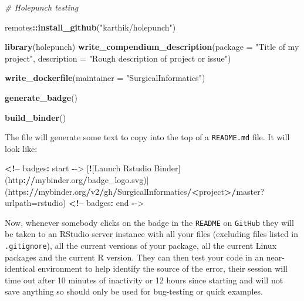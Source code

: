 \documentclass[]{book}
\newenvironment{Shaded}{\begin{snugshade}}{\end{snugshade}}
\newcommand{\CommentTok}[1]{\textcolor[rgb]{0.56,0.35,0.01}{\textit{#1}}}
\newcommand{\DataTypeTok}[1]{\textcolor[rgb]{0.13,0.29,0.53}{#1}}
\newcommand{\ErrorTok}[1]{\textcolor[rgb]{0.64,0.00,0.00}{\textbf{#1}}}
\newcommand{\KeywordTok}[1]{\textcolor[rgb]{0.13,0.29,0.53}{\textbf{#1}}}
\newcommand{\NormalTok}[1]{#1}
\newcommand{\OperatorTok}[1]{\textcolor[rgb]{0.81,0.36,0.00}{\textbf{#1}}}
\newcommand{\StringTok}[1]{\textcolor[rgb]{0.31,0.60,0.02}{#1}}
\begin{document}
\begin{Shaded}
\begin{Highlighting}[]
\CommentTok{# Holepunch testing}

\NormalTok{remotes}\OperatorTok{::}\KeywordTok{install_github}\NormalTok{(}\StringTok{"karthik/holepunch"}\NormalTok{)}

\KeywordTok{library}\NormalTok{(holepunch)}
\KeywordTok{write_compendium_description}\NormalTok{(}\DataTypeTok{package =} \StringTok{"Title of my project"}\NormalTok{, }
                             \DataTypeTok{description =} \StringTok{"Rough description of project or issue"}\NormalTok{)}

\KeywordTok{write_dockerfile}\NormalTok{(}\DataTypeTok{maintainer =} \StringTok{"SurgicalInformatics"}\NormalTok{)}

\KeywordTok{generate_badge}\NormalTok{()}

\KeywordTok{build_binder}\NormalTok{()}
\end{Highlighting}
\end{Shaded}

The file will generate some text to copy into the top of a \texttt{README.md} file. It will look like:

\begin{Shaded}
\begin{Highlighting}[]
\OperatorTok{<!--}\StringTok{ }\NormalTok{badges}\OperatorTok{:}\StringTok{ }\NormalTok{start }\OperatorTok{-}\NormalTok{->}
\NormalTok{[}\OperatorTok{!}\NormalTok{[Launch Rstudio Binder](http}\OperatorTok{:}\ErrorTok{//}\NormalTok{mybinder.org}\OperatorTok{/}\NormalTok{badge_logo.svg)](https}\OperatorTok{:}\ErrorTok{//}\NormalTok{mybinder.org}\OperatorTok{/}\NormalTok{v2}\OperatorTok{/}\NormalTok{gh}\OperatorTok{/}\NormalTok{SurgicalInformatics}\OperatorTok{/}\ErrorTok{<}\NormalTok{project}\OperatorTok{>}\ErrorTok{/}\NormalTok{master?}\DataTypeTok{urlpath=}\NormalTok{rstudio)}
\OperatorTok{<!--}\StringTok{ }\NormalTok{badges}\OperatorTok{:}\StringTok{ }\NormalTok{end }\OperatorTok{-}\NormalTok{->}
\end{Highlighting}
\end{Shaded}

Now, whenever somebody clicks on the badge in the \texttt{README} on \texttt{GitHub} they will be taken to an RStudio server instance with all your files (excluding files listed in \texttt{.gitignore}), all the current versions of your package, all the current Linux packages and the current R version. They can then test your code in an near-identical environment to help identify the source of the error, their session will time out after 10 minutes of inactivity or 12 hours since starting and will not save anything so should only be used for bug-testing or quick examples.
\end{document}
